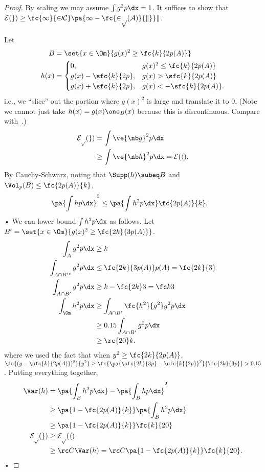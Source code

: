 \begin{proof}
By scaling we may assume $\int g^2p\dx=1$. It suffices to show that $\cal E(g) \ge \fc{1}{20C}\pa{1-\fc{2p(A)}{k}}k$.

Let 
\begin{align}
B &= \set{x\in \Om}{g(x)^2 \ge \fc{k}{2p(A)}}\\
h(x) &=\begin{cases}
0,& g(x)^2 \le \fc{k}{2p(A)}\\
g(x) - \sfc{k}{2p}, &g(x) > \sfc{k}{2p(A)}\\
g(x) + \sfc{k}{2p}, & g(x) < -\sfc{k}{2p(A)}.
\end{cases}
\end{align}
i.e., we ``slice'' out the portion where $g(x)^2$ is large and translate it to 0. (Note we cannot just take $h(x) = g(x) \one_B(x)$ because this is discontinuous. Compare with~\cite[Proposition 3.1.17]{bakry2013analysis}.)
\begin{align}
\cal E_p(g) &= \int\ve{\nb g}^2p\dx \\
&\ge \int \ve{\nb h}^2p\dx = \cal E(h).
\end{align}
By Cauchy-Schwarz, noting that $\Supp(h)\subeq B$ and $\Vol_p(B) \le \fc{2p(A)}{k}$,
\begin{align}
\pa{\int hp\dx}^2 & \le \pa{\int h^2p\dx} \fc{2p(A)}{k}.
\end{align}•
We can lower bound ${\int h^2p\dx}$ as follows. Let $B'=\set{x\in \Om}{g(x)^2 \ge \fc{2k}{3p(A)}}$.
\begin{align}
\int_A g^2p\dx &\ge k\\
\int_{A\cap {B'}^c} g^2 p\dx &\le \fc{2k}{3p(A)}p(A) = \fc{2k}{3}\\
\int_{A\cap B'} g^2 p\dx &\ge k - \fc{2k}3 = \fc k3\\
\int_\Om h^2p\dx &\ge \int_{A\cap B'} \fc{h^2}{g^2} g^2 p\dx \\
&\ge 0.15\int_{A\cap B'} g^2p\dx\\
&\ge \rc{20}k.
\end{align}
where we used the fact that when $y^2 \ge\fc{2k}{2p(A)}$, $\fc{(y-\sfc{k}{2p(A)})^2}{y^2}\ge \fc{\pa{\sfc{2k}{3p} - \sfc{k}{2p}}^2}{\fc{2k}{3p}} >0.15$.
Putting everything together,
\begin{align}
\label{eq:var-lb}
\Var(h) &= \pa{\int_B h^2p\dx} - \pa{\int_B hp\dx}^2 \\
&\ge \pa{1-\fc{2p(A)}{k}}\pa{\int_B h^2p\dx}\\
&\ge \pa{1-\fc{2p(A)}{k}}\fc{k}{20}\\
\cal E_p(g)&\ge \cal E_p(h)\\
&\ge \rc C\Var(h) =\rc C\pa{1-\fc{2p(A)}{k}}\fc{k}{20}.
\end{align}•
\end{proof}



